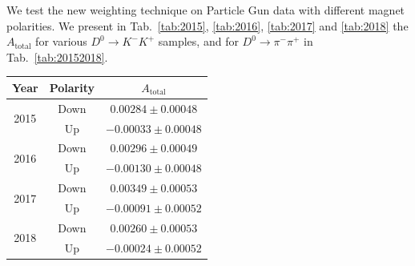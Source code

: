 \documentclass{article}
\begin{document}
        We test the new weighting technique on Particle Gun data with different magnet polarities.
        We present in Tab.~\ref{tab:2015}, \ref{tab:2016}, \ref{tab:2017} and \ref{tab:2018} the $A_\text{total}$ for various $D^0\to K^-K^+$ samples, and for $D^0\to \pi^-\pi^+$ in Tab.~\ref{tab:20152018}.
        \begin{center}
                \begin{tabular}{c|c|c}
                        Year & Polarity & $A_\text{total}$\\
                        \hline\hline
                        \multirow{2}{*}{2015} & Down & $0.00284 \pm 0.00048$\\
                        \cline{2-3}
                        & Up & $-0.00033\pm 0.00048$\\
                        \hline
                        \multirow{2}{*}{2016} & Down & $0.00296\pm 0.00049$\\
                        \cline{2-3}
                        & Up & $-0.00130\pm 0.00048$\\
                        \hline
                        \multirow{2}{*}{2017} & Down & $0.00349\pm 0.00053$\\
                        \cline{2-3}
                        & Up & $-0.00091\pm 0.00052$\\
                        \hline
                        \multirow{2}{*}{2018} & Down & $0.00260\pm 0.00053$\\
                        \cline{2-3}
                        & Up & $-0.00024\pm 0.00052$\\
                \end{tabular}
                \label{tab:20152018}
        \end{center}
\end{document}

